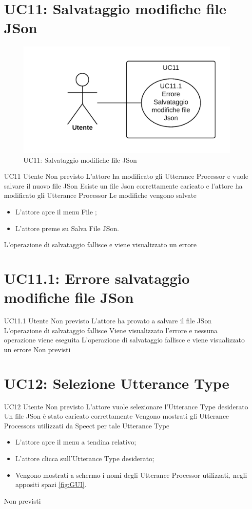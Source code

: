 \documentclass[../AnalisideiRequisiti.tex]{subfiles}
\begin{document}
\section{UC11: Salvataggio modifiche file JSon}
\begin{figure}[H]
	\centering
	\includegraphics[width=\textwidth]{../img/UC11.png}
	\caption{UC11: Salvataggio modifiche file JSon}
\end{figure}
\UserCase
{UC11}
{Utente}
{Non previsto}
{L'attore ha modificato gli Utterance Processor e vuole salvare il nuovo file JSon}
{Esiste un file Json correttamente caricato  e l'attore ha modificato gli Utterance Processor  }
{Le modifiche vengono salvate}
{
	\begin{itemize}
		\item{} L'attore apre il menu File ;
		\item{} L'attore preme su Salva File JSon.
	\end{itemize}
}
{L'operazione di salvataggio fallisce e viene visualizzato un errore }

\section{UC11.1: Errore salvataggio modifiche file JSon}
\UserCase
{UC11.1}
{Utente}
{Non previsto}
{L'attore ha provato a salvare il file JSon}
{L'operazione di salvataggio fallisce}
{Viene visualizzato l'errore e nessuna operazione viene eseguita}
{L'operazione di salvataggio fallisce e viene visualizzato un errore}
{Non previsti}

\section{UC12: Selezione Utterance Type}
\UserCase
{UC12}
{Utente}
{Non previsto}
{L'attore vuole selezionare l'Utterance Type desiderato}
{Un file JSon è stato caricato correttamente }
{Vengono mostrati gli Utterance Processors utilizzati da Speect per tale Utterance Type}
{
	\begin{itemize}
		\item{} L'attore apre il menu a tendina relativo;
		\item{} L'attore clicca sull'Utterance Type desiderato;
		\item{} Vengono mostrati a schermo i nomi degli Utterance Processor utilizzati, negli appositi spazi \ref{fig:GUI}.
	\end{itemize}
}
{Non previsti}
\end{document}
